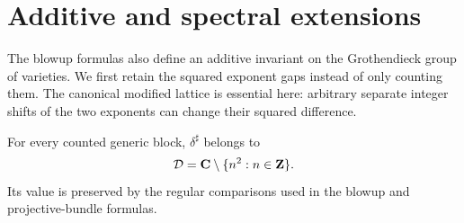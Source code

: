 \section{Additive and spectral extensions}
\label{sec:motivic}

The blowup formulas also define an additive invariant on the Grothendieck
group of varieties.  We first retain the squared exponent gaps instead of
only counting them.  The canonical modified lattice is essential here:
arbitrary separate integer shifts of the two exponents can change their
squared difference.

\begin{lemma}
\label{lem:constant-residue-spectrum}
%
%
For every counted generic block, \(\delta^\sharp\) belongs to
\[
 \mathcal D=\mathbf C\setminus\{n^2:n\in\mathbf Z\}.
\]
Its value is preserved by the regular comparisons used in the blowup and
projective-bundle formulas.
\end{lemma}

